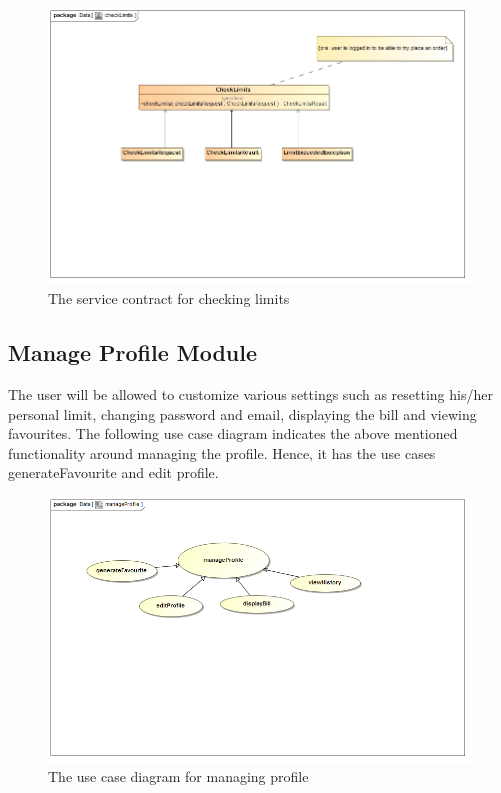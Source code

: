 \documentclass[a4paper,12pt]{article}
\begin{document}
\begin{figure}[H]
	\centering
	\includegraphics[width=1.0\textwidth]{images/checkLimitsSC.jpg}
	\caption{The service contract for checking limits}
\end{figure}

\subsection{Manage Profile Module}
 The user will be allowed to customize various settings such as resetting his/her personal limit, changing password and email, displaying the bill and viewing favourites. The following use case diagram indicates the above mentioned functionality around managing the profile. Hence, it has the use cases generateFavourite and edit profile.

\begin{figure}[H]
  \centering
    \includegraphics[width=1.0\textwidth]{images/manageProfile.png}
    \caption{The use case diagram for managing profile} 
\end{figure}
\end{document}
